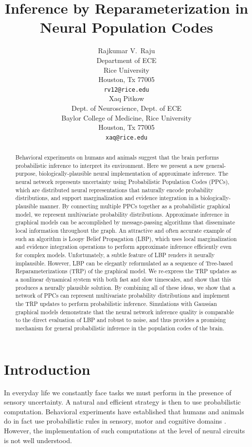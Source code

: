 \documentclass{article}
\title{Inference by Reparameterization in Neural Population Codes}
\author{
  Rajkumar V.~Raju\\
  Department of ECE\\
  Rice University\\
  Houston, Tx 77005 \\
  \texttt{rv12@rice.edu}\\
   \And
   Xaq Pitkow \\
   Dept. of Neuroscience, Dept. of ECE\\
   Baylor College of Medicine,   Rice University\\
   Houston, Tx 77005 \\
   \texttt{xaq@rice.edu} \\
}
\begin{document}
\maketitle

\begin{abstract}

Behavioral experiments on humans and animals suggest that the brain performs probabilistic inference to interpret its environment. Here we present a new general-purpose, biologically-plausible neural implementation of approximate inference. The neural network represents uncertainty using Probabilistic Population Codes (PPCs), which are distributed neural representations that naturally encode probability distributions, and support marginalization and evidence integration in a biologically-plausible manner. By connecting multiple PPCs together as a probabilistic graphical model, we represent multivariate probability distributions. Approximate inference in graphical models can be accomplished by message-passing algorithms that disseminate local information throughout the graph. An attractive and often accurate example of such an algorithm is Loopy Belief Propagation (LBP), which uses local marginalization and evidence integration operations to perform approximate inference efficiently even for complex models. Unfortunately, a subtle feature of LBP renders it neurally implausible. However, LBP can be elegantly reformulated as a sequence of Tree-based Reparameterizations (TRP) of the graphical model. We re-express the TRP updates as a nonlinear dynamical system with both fast and slow timescales, and show that this produces a neurally plausible solution. By combining all of these ideas, we show that a network of PPCs can represent multivariate probability distributions and implement the TRP updates to perform probabilistic inference. Simulations with Gaussian graphical models demonstrate that the neural network inference quality is comparable to the direct evaluation of LBP and robust to noise, and thus provides a promising mechanism for general probabilistic inference in the population codes of the brain.

\end{abstract}

\section{Introduction}

In everyday life we constantly face tasks we must perform in the presence of sensory uncertainty. A natural and efficient strategy is then to use probabilistic computation. Behavioral experiments have established that humans and animals do in fact use probabilistic rules in sensory, motor and cognitive domains \cite{knill1996perception,doya2007bayesian,pouget2013probabilistic}. However, the implementation of such computations at the level of neural circuits is not well understood.
\end{document}
